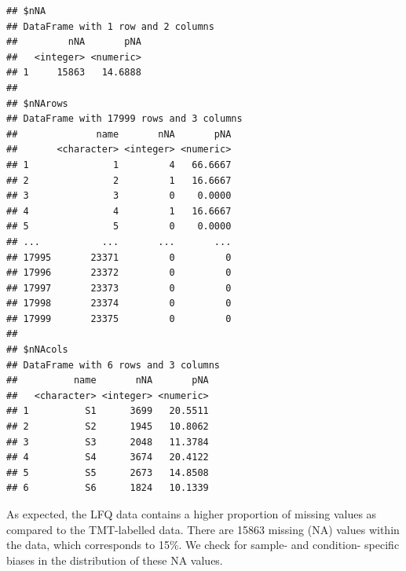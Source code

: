 \documentclass[9pt,a4paper,]{extarticle}
\newenvironment{Shaded}{\begin{snugshade}}{\end{snugshade}}
\newcommand{\AttributeTok}[1]{\textcolor[rgb]{0.13,0.29,0.53}{#1}}
\newcommand{\DecValTok}[1]{\textcolor[rgb]{0.00,0.00,0.81}{#1}}
\newcommand{\DocumentationTok}[1]{\textcolor[rgb]{0.56,0.35,0.01}{\textbf{\textit{#1}}}}
\newcommand{\FloatTok}[1]{\textcolor[rgb]{0.00,0.00,0.81}{#1}}
\newcommand{\FunctionTok}[1]{\textcolor[rgb]{0.13,0.29,0.53}{\textbf{#1}}}
\newcommand{\NormalTok}[1]{#1}
\newcommand{\SpecialCharTok}[1]{\textcolor[rgb]{0.81,0.36,0.00}{\textbf{#1}}}
\newcommand{\StringTok}[1]{\textcolor[rgb]{0.31,0.60,0.02}{#1}}
\begin{document}
\begin{verbatim}
## $nNA
## DataFrame with 1 row and 2 columns
##         nNA       pNA
##   <integer> <numeric>
## 1     15863   14.6888
## 
## $nNArows
## DataFrame with 17999 rows and 3 columns
##              name       nNA       pNA
##       <character> <integer> <numeric>
## 1               1         4   66.6667
## 2               2         1   16.6667
## 3               3         0    0.0000
## 4               4         1   16.6667
## 5               5         0    0.0000
## ...           ...       ...       ...
## 17995       23371         0         0
## 17996       23372         0         0
## 17997       23373         0         0
## 17998       23374         0         0
## 17999       23375         0         0
## 
## $nNAcols
## DataFrame with 6 rows and 3 columns
##          name       nNA       pNA
##   <character> <integer> <numeric>
## 1          S1      3699   20.5511
## 2          S2      1945   10.8062
## 3          S3      2048   11.3784
## 4          S4      3674   20.4122
## 5          S5      2673   14.8508
## 6          S6      1824   10.1339
\end{verbatim}

As expected, the LFQ data contains a higher proportion of missing values as
compared to the TMT-labelled data. There are 15863
missing (NA) values within the data, which corresponds to
15\%. We check for
sample- and condition- specific biases in the distribution of these NA values.

\begin{Shaded}
\end{Shaded}
\end{document}
